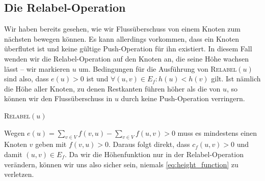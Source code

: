 \documentclass[12pt,a4paper,titlepage,onecolumn,ngerman,bibliography=totocnumbered]{scrartcl}
\theoremstyle{definition}
\theoremstyle{remark}
\begin{document}
\subsection{Die Relabel-Operation}
Wir haben bereits gesehen, wie wir Flussüberschuss von einem Knoten zum nächsten bewegen können.
Es kann allerdings vorkommen, dass ein Knoten überflutet ist und keine gültige Push-Operation für ihn existiert.
In diesem Fall wenden wir die Relabel-Operation auf den Knoten an, die seine Höhe wachsen lässt -- wir markieren $u$ um.
Bedingungen für die Ausführung von \textsc{Relabel}$(u)$ sind also, dass $e(u) > 0$ ist und $\forall (u,v)\in E_f: h(u) < h(v)$ gilt.
Ist nämlich die Höhe aller Knoten, zu denen Restkanten führen höher als die von $u$, so können wir den Flussüberschuss in $u$ durch keine Push-Operation verringern.
\begin{algorithm}[H]
	\caption{\textsc{Relabel}$(u)$}
	\label{alg:relabel}
	\begin{algorithmic}[1]
		\State{}
	\end{algorithmic}
\end{algorithm}
Wegen $e(u) = \sum_{v\in V}f(v,u) -\sum_{v\in V}f(u,v) > 0$ muss es mindestens einen Knoten $v$ geben mit $f(v,u) > 0$.
Daraus folgt direkt, dass $c_f(u,v) > 0$ und damit $(u,v)\in E_f$.
Da wir die Höhenfunktion nur in der Relabel-Operation verändern, können wir uns also sicher sein, niemals \eqref{eq:height_function} zu verletzen.
\end{document}
